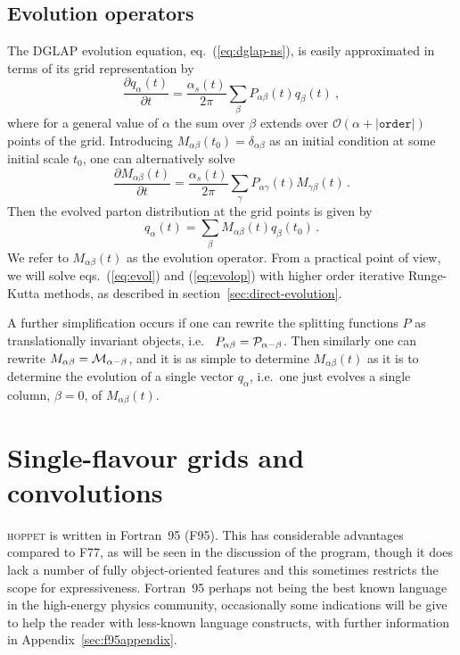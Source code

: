\documentclass[12pt]{article}
\newcommand{\lp}{\left(}
\newcommand{\rp}{\right)}
\newcommand{\ie}{i.e.\ }
\newcommand{\hoppet}{\textsc{hoppet}\xspace}
\newcommand{\ttt}[1]{\texttt{#1}}
\begin{document}
\subsection{Evolution operators}
\label{sec:evop}
The DGLAP evolution equation, eq.~(\ref{eq:dglap-ns}), is easily 
approximated in terms of its grid representation by
\begin{equation}
\label{eq:evol}
  \frac{\partial q_{\alpha}(t)}{\partial t}  = \frac{\alpha_s(t)}{2\pi}
\sum_{\beta} P_{\alpha\beta}(t) q_\beta(t) \ ,
\end{equation}
where for a general value of $\alpha$ the sum over $\beta$ extends over
$\mathcal{O}\lp \alpha + |\ttt{order}| \rp$ 
points of the grid.
Introducing $M_{\alpha\beta}(t_0) = \delta_{\alpha\beta}$ as an initial
condition at some initial scale $t_0$, one can
alternatively solve
\begin{equation}
\label{eq:evolop}
  \frac{\partial M_{\alpha\beta}(t) }{\partial t} = \frac{\alpha_s(t)}{2\pi}
\sum_{\gamma} P_{\alpha\gamma}(t)
  M_{\gamma\beta}(t)\,.
\end{equation}
Then the evolved parton distribution at the grid points is
given by
\begin{equation}
  q_{\alpha}(t)  = \sum_{\beta} M_{\alpha\beta}(t) q_\beta(t_0)\,.
\end{equation}
We refer to $M_{\alpha\beta}(t)$ as the evolution operator. From 
a practical point of view, we will solve eqs.~(\ref{eq:evol})
and (\ref{eq:evolop})
with higher order iterative Runge-Kutta methods, as described in
section~\ref{sec:direct-evolution}.

A further simplification occurs if one can rewrite the splitting
functions $P$ as translationally invariant objects, \ie
$P_{\alpha\beta} = \cal P_{\alpha-\beta}$.
%
Then similarly one can rewrite $M_{\alpha\beta} = \cal
M_{\alpha-\beta}$, and it is as simple to determine
$M_{\alpha\beta}(t)$ as it is to determine the evolution of a single
vector $q_\alpha$, i.e.\ one just evolves a single column, $\beta =
0$, of $M_{\alpha\beta}(t)$.



\section{Single-flavour grids and convolutions}
\label{sec:singleflav}


\hoppet is written in Fortran~95 (F95). This has considerable
advantages compared to F77, as will be seen in the discussion of the
program, though it does lack a number of fully object-oriented
features and this sometimes restricts the scope for expressiveness.
Fortran~95 perhaps not being the best known language in the
high-energy physics community, occasionally some indications will be give to
help the reader with less-known language constructs, with further
information in Appendix~\ref{sec:f95appendix}.
\end{document}
